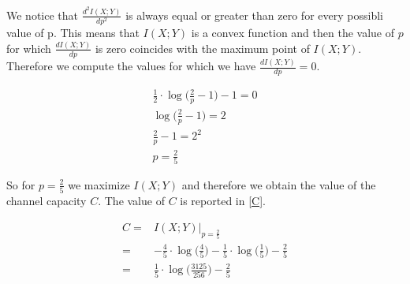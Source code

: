 We notice that $\frac{d^2I(X;Y)}{dp^2}$ is always equal or greater than zero for every possibli value of p. This means that $I(X;Y)$ is a convex function and then the value of $p$ for which $\frac{dI(X;Y)}{dp}$ is zero coincides with the maximum point of $I(X;Y)$. Therefore we compute the values for which we have $\frac{dI(X;Y)}{dp}=0$.

\begin{equation}
\begin{gathered}
	\frac{1}{2} \cdot \log \Big ( \frac{2}{p} - 1\Big)-1 = 0 \\
	\log \Big ( \frac{2}{p} - 1\Big) = 2 \\
	\frac{2}{p} - 1 = 2^2 \\
	p = \frac{2}{5}
\end{gathered}
\end{equation}

So for $p=\frac{2}{5}$ we maximize $I(X;Y)$ and therefore we obtain the value of the channel capacity $C$. The value of $C$ is reported in \eqref{C}.

\begin{equation}
\begin{aligned}
	C = & I(X;Y)|_{p=\frac{2}{5}} \\ = &-\frac{4}{5} \cdot \log\Big (\frac{4}{5}\Big)- \frac{1}{5}\cdot\log \Big(\frac{1}{5}\Big)-\frac{2}{5} \\
	= & \frac{1}{5} \cdot \log \Big (\frac{3125}{256} \Big)-\frac{2}{5}
	\label{C}
\end{aligned}
\end{equation}
